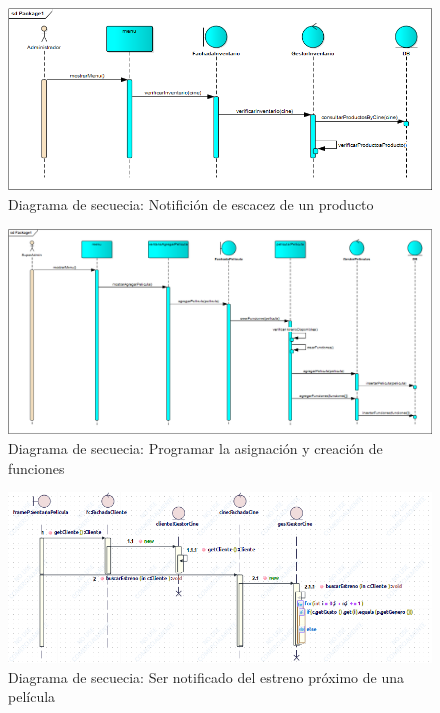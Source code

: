 \begin{figure}[h!]
\centering
\includegraphics[width=1\linewidth]{diseno/requerimientos/imgs/EscacezSec}
	\caption{Diagrama de secuecia: Notifición de escacez de un producto}
\end{figure}
\begin{figure}[h!]
\centering
\includegraphics[width=1\linewidth]{diseno/requerimientos/imgs/FuncionesSec}
	\caption{Diagrama de secuecia: Programar la asignación y creación de funciones}
\end{figure}
\begin{figure}[h!]
\centering
\includegraphics[width=1\linewidth]{diseno/requerimientos/imgs/EstrenosSec}
	\caption{Diagrama de secuecia: Ser notificado del estreno próximo de una película}
\end{figure}
